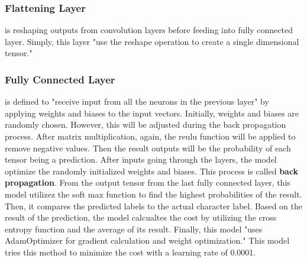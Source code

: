 \subsubsection{Flattening Layer}
is reshaping outputs from convolution layers before feeding into fully connected layer. Simply,
this layer "use the reshape operation to create a single dimensional tensor."\cite{sachan_2017}


\subsubsection{Fully Connected Layer}
is defined to "receive input from all the neurons in the previous layer"\cite{sachan_2017} by applying
weights and biases to the input vectors. Initially, weights and biases are randomly chosen. However, this
will be adjusted during the back propagation process. After matrix multiplication, again, the reulu function
will be applied to remove negative values. Then the result outputs will be the probability of each tensor being
a prediction.
\newline
\newline
\indent
After inputs going through the layers, the model optimize the randomly initialized weights and biases. This process is called
\textbf{back propagation}.
From the output tensor from the last fully connected layer, this model utilizez the soft max function to find
the highest probabilities of the result. Then, it compares the predicted labels to the actual character label.
Based on the result of the prediction, the model calcualtes the cost by utilizing the cross entropy function and the
average of its result. Finally, this model "uses AdamOptimizer for gradient calculation and weight optimization."\cite{sachan_2017}
This model tries this method to minimize the cost with a learning rate of 0.0001.
